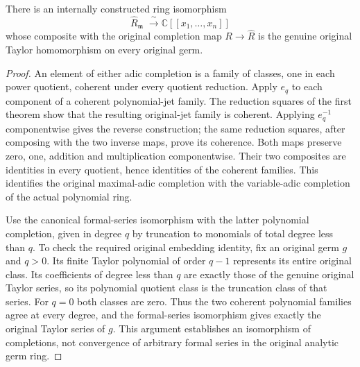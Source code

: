 \begin{theorem}
\label{hir:actual-original-maximal-adic-formal-ring-equivalence}
\leanok
There is an internally constructed ring isomorphism
\[
 \widehat R_{\mathfrak m}\;\xrightarrow{\;\sim\;}
 \mathbb C[[x_1,\ldots,x_n]]
\]
whose composite with the original completion map $R\to\widehat R$ is
the genuine original Taylor homomorphism on every original germ.
\end{theorem}
\begin{proof}
An element of either adic completion is a family of classes, one in each
power quotient, coherent under every quotient reduction. Apply $e_q$ to
each component of a coherent polynomial-jet family. The reduction squares
of the first theorem show that the resulting original-jet family is
coherent. Applying $e_q^{-1}$ componentwise gives the reverse construction;
the same reduction squares, after composing with the two inverse maps,
prove its coherence. Both maps preserve zero, one, addition and
multiplication componentwise. Their two composites are identities in
every quotient, hence identities of the coherent families. This identifies
the original maximal-adic completion with the variable-adic completion of
the actual polynomial ring.

Use the canonical formal-series isomorphism with the latter polynomial
completion, given in degree $q$ by truncation to monomials of total degree
less than $q$. To check the required original embedding identity, fix an
original germ $g$ and $q>0$. Its finite Taylor polynomial of order $q-1$
represents its entire original class. Its coefficients of degree less than
$q$ are exactly those of the genuine original Taylor series, so its
polynomial quotient class is the truncation class of that series. For
$q=0$ both classes are zero. Thus the two coherent polynomial families
agree at every degree, and the formal-series isomorphism gives exactly the
original Taylor series of $g$. This argument establishes an isomorphism of
completions, not convergence of arbitrary formal series in the original
analytic germ ring.
\end{proof}
